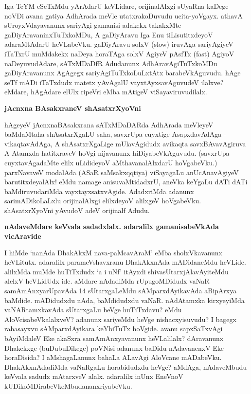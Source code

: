 Iga TeYM eSeTxMdu yArAdarU keVLidare, orijinalAlxgi sUyaRna kaDege noVDi avana gatiya AdhArada meVle utatxrakoDuvudu ucita-yoVgayx. athavA sUroyxVdayavanunx sariyAgi gamanisi adakekx takakxMte gaDiyAravaninxTuTxkoMDu, A gaDiyAravu Iga Enu tiLisutitxdeyoV adaraMtAdarU heVLabeVku. gaDiyAravu solxV {\rm (slow)} iruvAga sariyAgiyeV iTaTxrU muMdakekx naDeya horaTAga solxV AgiyeV pAsfTx {\rm (fast)} AgiyoV  naDeyuvudAdare, sATxMDaDfR Adudanunx AdhAravAgiTuTxkoMDu gaDiyAravanunx AgAgegx sariyAgiTuTxkoLuLxtAtx barabeVkAguvudu. hAge seTf mADi iTaTxdudx matetx yAvAgalU vayxtAyxsavAguvudeV ilalxve? eMdare, hAgAdare elUlx ripeVri eMba mAtigeV viSayaviruvudilalx.

{\bigskip
\noindent
{\large\bf jAcnxna BAsakxraneV shAsatxrXyoVni}}\label{page168}
\medskip

\noindent
hAgeyeV jAcnxnaBAsakxrana sATxMDaDARda AdhArada meVleyeV baMdaMtaha shAsatxrXgaLU saha, savxrUpa cuyxtige AsapxdavAdAga - vikaqtavAdAga, A shAsatxrXgaLige mUlavAgidudx avikaqta savxBAvavAgiruva A Atamxda hatitxraveV hoVgi nijavanunx hiDiyabeVkAguvudu. (savxrUpa cuyxtavAgadaMte elilx uLidideyoV aMthavanalAlxdarU hoVgabeVku.) parxNavaveV modalAda (ASaR saMsakxqqtiya) viSayagaLu anUcAnavAgiyeV barutitxdeyalAlx! eMdu namage anisuvaMtidadxrU, aneVka keYgaLu dATi dATi baMdiruvudariMda vayxtayxsatxvAgide. AdadxriMda adanunx sarimADikoLaLxlu orijinalAlxgi elilxdeyoV alilxgeV hoVgabeVku. shAsatxrXyoVni yAvudoV adeV orijinalf Adudu.

{\bigskip
\noindent
{\large\bf nAdaveMdare keVvala sadadxlalx. adaralilx gamanisabeVkAda vicAravide}}\label{page169}
\medskip

\noindent
I hiMde `nanAda DhakAkxM nava-paMcavAraM' eMba sholxVkavanunx heVLitutx. adaralilx parameVshavxranu DhakAkxnAda mADidaneMdu heVLide. alilxMda muMde huTiTxdudx `a i uNf' itAyxdi shivasUtarxjAlavAyiteMdu alelxV heVLidUdx ide. aMdare nAdadiMda rUpugoMDidudx vaNaR samAmAnxyarUpavAda 14 sUtarxgaLeMdu sAMparxdAyikavAda aBipArxya baMdide. mADidudxdu nAda, baMdidudxdu vaNaR. nAdAtamxka kirxyeyiMda vaNARtamxkavAda sUtarxgaLu heVge huTiTxdavu? eMdu AloVcisabeVkalalxveV? adanunx sariyeMdu heVge nishacxyisuvudu? I bagegx rahasayxvu sAMparxdAyikara keYbiTuTx hoVgide. avanu sapxSaTxvAgi bAyiMdaleV Eke akaSxra samAmAnxyavanunx heVLalilalx? dAravanunx Dhakekxge (buDubuDikege) poVNisi adanunx baDidu nAdavanenxV Eke horaDisida? I aMshagaLanunx bahaLa ALavAgi AloVcane mADabeVku. DhakAkxnAdadiMda vaNaRgaLu horabidudxdu heVge? aMdAga, nAdaveMbudu keVvala sadudx mAtarxveV alalx. adaralilx inUnx EneVnoV kUDikoMDirabeVkeMbudananxriyabeVku.

